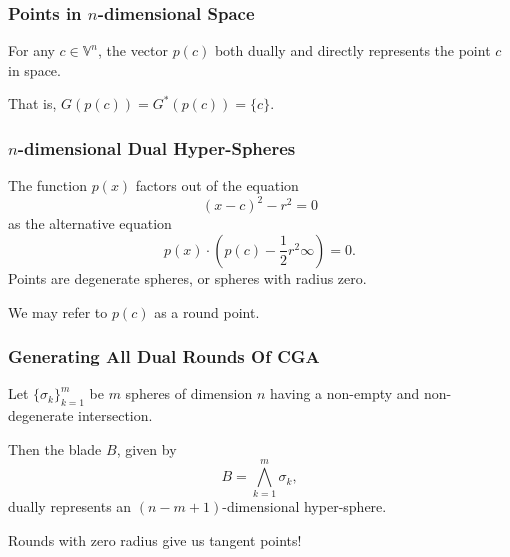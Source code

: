 \documentclass{beamer}
\newcommand{\V}{\mathbb{V}}
\newcommand{\nvai}{\infty}
\begin{document}
\begin{frame}
\frametitle{Points in $n$-dimensional Space}
\pause
For any $c\in\V^n$, the vector $p(c)$ both \alert{dually} and \alert{directly} represents the point $c$ in space.\pause

That is, $G(p(c)) = G^*(p(c)) = \{c\}$.
\end{frame}

\begin{frame}
\frametitle{$n$-dimensional \alert{Dual} Hyper-Spheres}
\pause
The function $p(x)$ factors out of the equation
\begin{equation*}
(x-c)^2 - r^2 = 0
\end{equation*}
as the alternative equation
\begin{equation*}
p(x)\cdot\left(p(c) - \frac{1}{2}r^2\nvai\right) = 0.
\end{equation*}\pause
Points are degenerate spheres, or spheres with radius zero.\pause

We may refer to $p(c)$ as a \alert{round} point.
\end{frame}

\begin{frame}
\frametitle{Generating All \alert{Dual Rounds} Of CGA}
\pause
Let $\{\sigma_k\}_{k=1}^m$ be $m$ spheres of dimension $n$ having a \alert{non-empty} and
\alert{non-degenerate} intersection.\pause

Then the blade $B$, given by
\begin{equation*}
B = \bigwedge_{k=1}^m\sigma_k,
\end{equation*}
\alert{dually} represents an $(n-m+1)$-dimensional hyper-sphere.\pause

\alert{Rounds} with zero radius give us \alert{tangent} points!
\end{frame}
\end{document}
